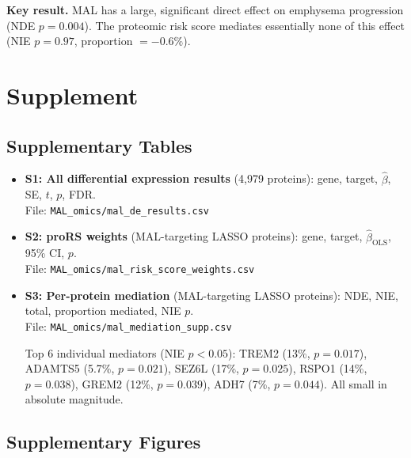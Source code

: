 \documentclass[11pt, letterpaper]{article}
\begin{document}
\textbf{Key result.} MAL has a large, significant direct effect on
emphysema progression (NDE $p = 0.004$). The proteomic risk score
mediates essentially none of this effect (NIE $p = 0.97$, proportion
$= -0.6\%$).

\section*{Supplement}

\subsection*{Supplementary Tables}

\begin{itemize}
  \item \textbf{S1: All differential expression results} (4,979
    proteins): gene, target, $\hat\beta$, SE, $t$, $p$, FDR. \\
    File: \texttt{MAL\_omics/mal\_de\_results.csv}

  \item \textbf{S2: proRS weights} (MAL-targeting LASSO proteins): gene, target,
    $\hat\beta_{\text{OLS}}$, 95\% CI, $p$. \\
    File: \texttt{MAL\_omics/mal\_risk\_score\_weights.csv}

  \item \textbf{S3: Per-protein mediation} (MAL-targeting LASSO proteins): NDE, NIE,
    total, proportion mediated, NIE $p$. \\
    File: \texttt{MAL\_omics/mal\_mediation\_supp.csv}

    Top 6 individual mediators (NIE $p < 0.05$): TREM2 (13\%,
    $p = 0.017$), ADAMTS5 (5.7\%, $p = 0.021$), SEZ6L (17\%,
    $p = 0.025$), RSPO1 (14\%, $p = 0.038$), GREM2 (12\%,
    $p = 0.039$), ADH7 (7\%, $p = 0.044$). All small in absolute
    magnitude.
\end{itemize}

\subsection*{Supplementary Figures}
\end{document}

